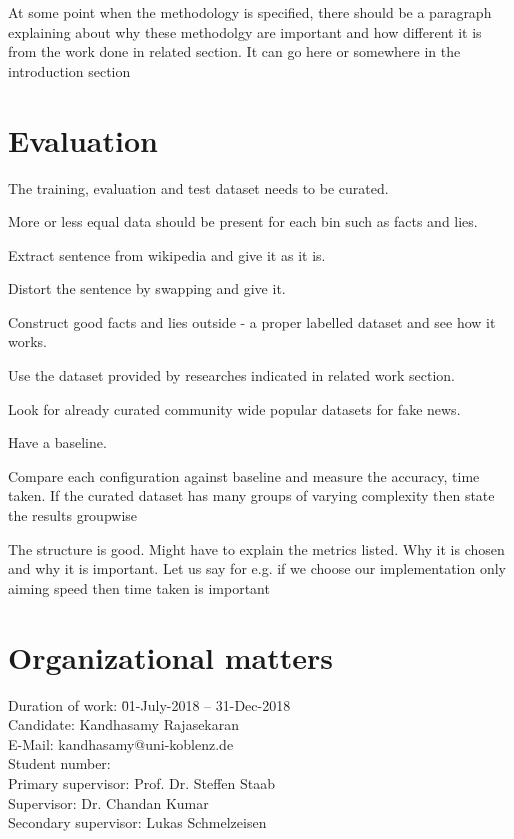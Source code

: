 \documentclass[a4paper, 11pt]{article}
\makeatletter
\newcommand{\myName}{Kandhasamy Rajasekaran}
\newcommand{\emailID}{kandhasamy@uni-koblenz.de}
\newcommand{\matriculationID}{216100855}
\newcommand{\StartDate}{01-July-2018}
\newcommand{\EndDate}{31-Dec-2018}
\newcommand{\expert}{Prof. Dr. Steffen Staab}%
\newcommand{\supervisor}{Dr. Chandan Kumar} %
\newcommand{\secondSupervisor}{Lukas Schmelzeisen} %
\makeatother
\begin{document}
At some point when the methodology is specified, there should be a paragraph explaining about why these methodolgy are important and how different it is from the work done in related section. It can go here or somewhere in the introduction section
\color{black}

\section{Evaluation}

The training, evaluation and test dataset needs to be curated. 

More or less equal data should be present for each bin such as facts and lies.

Extract sentence from wikipedia and give it as it is.

Distort the sentence by swapping and give it.

Construct good facts and lies outside - a proper labelled dataset and see how it works.

Use the dataset provided by researches indicated in related work section.

Look for already curated community wide popular datasets for fake news.

Have a baseline.

Compare each configuration against baseline and measure the accuracy, time taken. If the curated dataset has many groups of varying complexity then state the results groupwise


\color{red}
The structure is good. Might have to explain the metrics listed. Why it is chosen and why it is important. Let us say for e.g. if we choose our implementation only aiming speed then time taken is important
\color{black}

\newpage

\section{Organizational matters}

\begin{tabbing}
Duration of work: \hspace{1.1cm} \= \StartDate{} -- \EndDate{}\\
\vspace{0.5ex}Candidate:	\> \myName{}\\
\vspace{0.5ex}E-Mail:	\> \emailID{}\\
\vspace{0.5ex}Student number: \> \matriculationID{}\\
\vspace{0.5ex}Primary supervisor: \> \expert{}\\
Supervisor: \> \supervisor{}\\
Secondary supervisor: \> \secondSupervisor{}\\
\end{tabbing}
\end{document}
